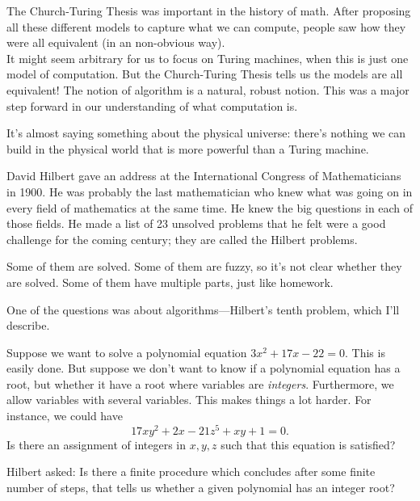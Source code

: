 The Church-Turing Thesis was important in the history of math. After proposing all these different models to capture what we can compute, people saw how they were all equivalent (in an non-obvious way).\\


\vskip0.15in
It might seem arbitrary for us to focus on Turing machines, when this is just one model of computation. But the Church-Turing Thesis tells us the models are all equivalent! The notion of algorithm is a natural, robust notion. This was a major step forward in our understanding of what computation is.

It's almost saying something about the physical universe: there's nothing we can build in the physical world that is more powerful than a Turing machine.

David Hilbert gave an address at the International Congress of Mathematicians in 1900.
He was probably the last mathematician who knew what was going on in every field of mathematics at the same time. He knew the big questions in each of those fields. He made a list of 23 unsolved problems that he felt were a good challenge for the coming century; they are called the Hilbert problems. 

Some of them are solved. Some of them are fuzzy, so it's not clear whether they are solved. Some of them have multiple parts, just like homework.

One of the questions was about algorithms---Hilbert's tenth problem, which I'll describe.

Suppose we want to solve a polynomial equation
$3x^2+17x-22=0.$
This is easily done. 
But suppose we don't want to know if a polynomial equation has a root, but whether it have a root where variables are {\it integers}. Furthermore, we allow variables with several variables. This makes things a lot harder. For instance, we could have
\[
17xy^2+2x-21z^5+xy+1=0.
\]
Is there an assignment of integers in $x,y,z$ such that this equation is satisfied?

Hilbert asked: Is there a finite procedure which concludes after some finite number of steps, that tells us whether a given polynomial has an integer root?

